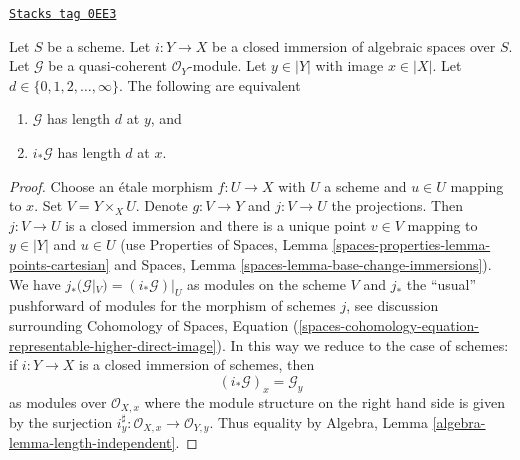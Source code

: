 \begin{lemma}
\label{spaces-chow-lemma-length-closed-immersion}
\href{https://stacks.math.columbia.edu/tag/0EE3}{\texttt{Stacks tag 0EE3}}

Let $S$ be a scheme. Let $i : Y \to X$ be a closed immersion of
algebraic spaces over $S$. Let $\mathcal{G}$ be a quasi-coherent
$\mathcal{O}_Y$-module. Let $y \in |Y|$ with image $x \in |X|$.
Let $d \in \{0, 1, 2, \ldots, \infty\}$. The following are
equivalent
\begin{enumerate}
\item $\mathcal{G}$ has length $d$ at $y$, and
\item $i_*\mathcal{G}$ has length $d$ at $x$.
\end{enumerate}
\end{lemma}

\begin{proof}
Choose an \'etale morphism $f : U \to X$ with $U$ a scheme
and $u \in U$ mapping to $x$. Set $V = Y \times_X U$.
Denote $g : V \to Y$ and $j : V \to U$ the projections.
Then $j : V \to U$ is a closed immersion and there is a unique
point $v \in V$ mapping to $y \in |Y|$ and $u \in U$
(use Properties of Spaces, Lemma \ref{spaces-properties-lemma-points-cartesian}
and Spaces, Lemma \ref{spaces-lemma-base-change-immersions}).
We have $j_*(\mathcal{G}|_V) = (i_*\mathcal{G})|_U$ as modules
on the scheme $V$ and $j_*$ the ``usual'' pushforward of modules
for the morphism of schemes $j$, see discussion surrounding
Cohomology of Spaces, Equation
(\ref{spaces-cohomology-equation-representable-higher-direct-image}).
In this way we reduce to the case of schemes: if $i : Y \to X$
is a closed immersion of schemes, then
$$
(i_*\mathcal{G})_x = \mathcal{G}_y
$$
as modules over $\mathcal{O}_{X, x}$ where the module structure
on the right hand side is given by the surjection
$i_y^\sharp : \mathcal{O}_{X, x} \to \mathcal{O}_{Y, y}$.
Thus equality by
Algebra, Lemma \ref{algebra-lemma-length-independent}.
\end{proof}


